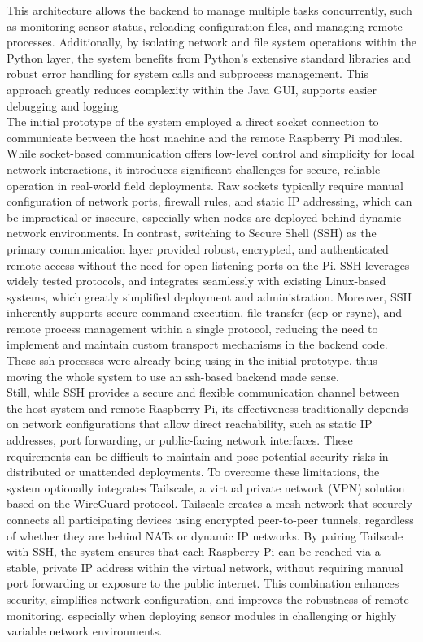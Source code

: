 \documentclass{article}
\begin{document}
This architecture allows the backend to manage multiple tasks concurrently, such as monitoring sensor status, reloading configuration files, and managing remote processes. Additionally, by isolating network and file system operations within the Python layer, the system benefits from Python’s extensive standard libraries and robust error handling for system calls and subprocess management. This approach greatly reduces complexity within the Java GUI, supports easier debugging and logging \\

The initial prototype of the system employed a direct socket connection to communicate between the host machine and the remote Raspberry Pi modules. While socket-based communication offers low-level control and simplicity for local network interactions, it introduces significant challenges for secure, reliable operation in real-world field deployments. Raw sockets typically require manual configuration of network ports, firewall rules, and static IP addressing, which can be impractical or insecure, especially when nodes are deployed behind dynamic network environments. In contrast, switching to Secure Shell (SSH) as the primary communication layer provided robust, encrypted, and authenticated remote access without the need for open listening ports on the Pi. SSH leverages widely tested protocols, and integrates seamlessly with existing Linux-based systems, which greatly simplified deployment and administration. Moreover, SSH inherently supports secure command execution, file transfer (scp or rsync), and remote process management within a single protocol, reducing the need to implement and maintain custom transport mechanisms in the backend code. These ssh processes were already being using in the initial prototype, thus moving the whole system to use an ssh-based backend made sense.\\

Still, while SSH provides a secure and flexible communication channel between the host system and remote Raspberry Pi, its effectiveness traditionally depends on network configurations that allow direct reachability, such as static IP addresses, port forwarding, or public-facing network interfaces. These requirements can be difficult to maintain and pose potential security risks in distributed or unattended deployments. To overcome these limitations, the system optionally integrates Tailscale, a virtual private network (VPN) solution based on the WireGuard protocol. Tailscale creates a mesh network that securely connects all participating devices using encrypted peer-to-peer tunnels, regardless of whether they are behind NATs or dynamic IP networks. By pairing Tailscale with SSH, the system ensures that each Raspberry Pi can be reached via a stable, private IP address within the virtual network, without requiring manual port forwarding or exposure to the public internet. This combination enhances security, simplifies network configuration, and improves the robustness of remote monitoring, especially when deploying sensor modules in challenging or highly variable network environments.
 
\end{document}
